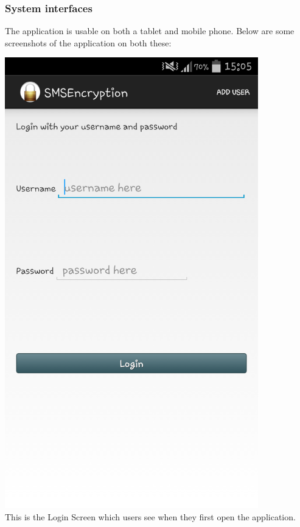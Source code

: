 \subsubsection{System interfaces}
The application is usable on both a tablet and mobile phone. Below are some screenshots of the application on both these:\\
\begin{center}
 \includegraphics[width=11cm]{screenshots/normal/1_LoginScreen.png}
\textbf{\\}
 This is the Login Screen which users see when they first open the application.
\end{center}
